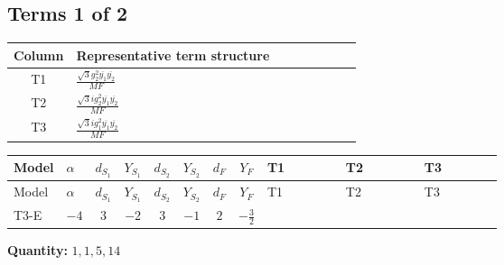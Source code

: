 \documentclass[8pt]{article}
\begin{document}
\begin{landscape}
\subsection*{Terms 1 of 2}
\begin{center}
\begin{tabular}{@{}c >{\raggedright\arraybackslash}p{0.82\linewidth}@{}}
\toprule
Column & Representative term structure \\
\midrule
T1 & \(\displaystyle \frac{\sqrt{3} g_{2}^{2} \overline{y_{1}} \overline{y_{2}}}{MF}\) \\
\midrule
T2 & \(\displaystyle \frac{\sqrt{3} i g_{2}^{2} \overline{y_{1}} \overline{y_{2}}}{MF}\) \\
\midrule
T3 & \(\displaystyle \frac{\sqrt{3} i g_{1}^{2} \overline{y_{1}} \overline{y_{2}}}{MF}\) \\
\midrule
\bottomrule
\end{tabular}
\end{center}
\smallskip
\tiny
\begin{longtable}{@{}llcccccc >{\raggedright\arraybackslash}p{0.21\linewidth} >{\raggedright\arraybackslash}p{0.21\linewidth} >{\raggedright\arraybackslash}p{0.21\linewidth}@{}}
\toprule
Model & $\alpha$ & $d_{S_1}$ & $Y_{S_1}$ & $d_{S_2}$ & $Y_{S_2}$ & $d_F$ & $Y_F$ & T1 & T2 & T3 \\
\midrule
\endfirsthead
\toprule
Model & $\alpha$ & $d_{S_1}$ & $Y_{S_1}$ & $d_{S_2}$ & $Y_{S_2}$ & $d_F$ & $Y_F$ & T1 & T2 & T3 \\
\midrule
\endhead
T3-E & $-4$ & $3$ & $-2$ & $3$ & $-1$ & $2$ & $-\frac{3}{2}$ & \scriptsize\adjustbox{max width=\linewidth}{$\begin{gathered} \frac{\sqrt{3} g_{2}^{2} \overline{y_{1}} \overline{y_{2}}}{6 MF}\end{gathered}$} & \scriptsize\adjustbox{max width=\linewidth}{$\begin{gathered} - \frac{11 \sqrt{3} i g_{2}^{2} \overline{y_{1}} \overline{y_{2}}}{8 MF}\end{gathered}$} & \scriptsize\adjustbox{max width=\linewidth}{$\begin{gathered} - \frac{9 \sqrt{3} i g_{1}^{2} \overline{y_{1}} \overline{y_{2}}}{8 MF}\end{gathered}$} \\
\midrule
\bottomrule
\end{longtable}
\clearpage
\noindent\textbf{Quantity: }$\mathrm{1,1,5,14}$\par\smallskip

\end{landscape}
\end{document}
